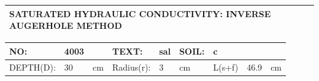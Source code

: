 \documentclass[11pt,a4paper]{article}
\begin{document}
\begin{table}[h]
\begin{tabular}{|l|}
\hline
SATURATED HYDRAULIC CONDUCTIVITY: INVERSE AUGERHOLE METHOD \\ \hline
\end{tabular}
\end{table}

\begin{table}[h]
\begin{tabular}{|l|l|l|l|l|l|l|l|l|}
\hline
NO: & 4003 &   & TEXT: & sal & SOIL: & c &  &  \\ \hline
DEPTH(D): & 30 & cm & Radius(r): & 3 & cm & L(s+f) & 46.9 & cm \\ \hline
\end{tabular}
\end{table}
\end{document}
